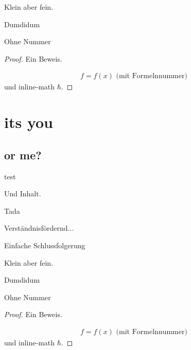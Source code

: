 \documentclass[ngerman,a4paper]{report}
\theoremstyle{break}
\numberwithin{dummy}{section}
\begin{document}
\begin{truelemmaName}
	Klein aber fein.
\end{truelemmaName}

\begin{trueremark}[Hossa]
	Dumdidum
\end{trueremark}

\begin{trueexample}[Test]
	Ohne Nummer
\end{trueexample}

\begin{proof}
	Ein Beweis.
	
	\begin{align}
		f = f(x) \text{ (mit Formelnnummer)}
	\end{align}
	und inline-math $\hbar$.
\end{proof}

\chapter{its you}

\section{or me?}

\begin{truetheorem}
    test
\end{truetheorem}

\begin{trueproposition}
    Und Inhalt.
\end{trueproposition}

\begin{truedefinition}
    Tada
\end{truedefinition}

\begin{trueexample}
    Verständnisfördernd...
\end{trueexample}

\begin{trueconclusion}[Ergänzung]
    Einfache Schlussfolgerung
\end{trueconclusion}

\begin{truelemma}
    Klein aber fein.
\end{truelemma}

\begin{trueremark}[Hossa]
    Dumdidum
\end{trueremark}

\begin{trueexample}[Test]
    Ohne Nummer
\end{trueexample}

\begin{proof}
    Ein Beweis.
    
    \begin{align}
    f = f(x) \text{ (mit Formelnnummer)}
    \end{align}
    und inline-math $\hbar$.
\end{proof}

\end{document}

